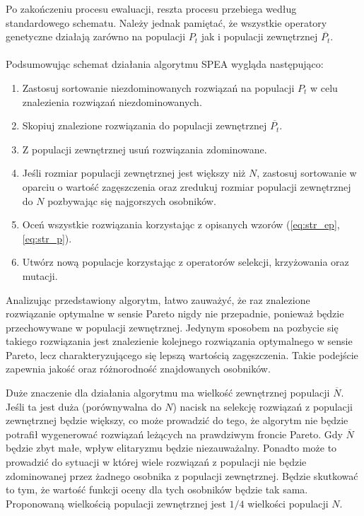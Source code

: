 \documentclass[twoside]{iisthesis}
\begin{document}
Po zakończeniu procesu ewaluacji, reszta procesu przebiega według standardowego schematu. Należy jednak pamiętać, że wszystkie operatory genetyczne działają zarówno na populacji $P_{t}$ jak i populacji zewnętrznej $\overline{P_{t}}$.\\\\
Podsumowując schemat działania algorytmu SPEA wygląda następująco:\\
\begin{enumerate}
	\item Zastosuj sortowanie niezdominowanych rozwiązań na populacji $P_{t}$ w celu znalezienia rozwiązań niezdominowanych.
	\item Skopiuj znalezione rozwiązania do populacji zewnętrznej $\overline{P_{t}}$.
	\item Z populacji zewnętrznej usuń rozwiązania zdominowane.
	\item Jeśli rozmiar populacji zewnętrznej jest większy niż $N$, zastosuj sortowanie w oparciu o wartość zagęszczenia oraz zredukuj rozmiar populacji zewnętrznej do $N$ pozbywając się najgorszych osobników.
	\item Oceń wszystkie rozwiązania korzystając z opisanych wzorów (\ref{eq:str_ep}, \ref{eq:str_p}).
	\item Utwórz nową populacje korzystając z operatorów selekcji, krzyżowania oraz mutacji.\\
\end{enumerate}

Analizując przedstawiony algorytm, łatwo zauważyć, że raz znalezione rozwiązanie optymalne w sensie Pareto nigdy nie przepadnie, ponieważ będzie przechowywane w populacji zewnętrznej. Jedynym sposobem na pozbycie się takiego rozwiązania jest znalezienie kolejnego rozwiązania optymalnego w sensie Pareto, lecz charakteryzującego się lepszą wartością zagęszczenia. Takie podejście zapewnia jakość oraz różnorodność znajdowanych osobników.

Duże znaczenie dla działania algorytmu ma wielkość zewnętrznej populacji $\overline{N}$. Jeśli ta jest duża (porównywalna do $N$)  nacisk na selekcję rozwiązań z populacji zewnętrznej będzie większy, co może prowadzić do tego, że algorytm nie będzie potrafił wygenerować rozwiązań leżących na prawdziwym froncie Pareto. Gdy $\overline{N}$ będzie zbyt małe, wpływ elitaryzmu będzie niezauważalny. Ponadto może to prowadzić do sytuacji w której wiele rozwiązań z populacji nie będzie zdominowanej przez żadnego osobnika z populacji zewnętrznej. Będzie skutkować to tym, że wartość funkcji oceny dla tych osobników będzie tak sama. Proponowaną wielkością populacji zewnętrznej jest $1/4$ wielkości populacji $N$.
\end{document}
